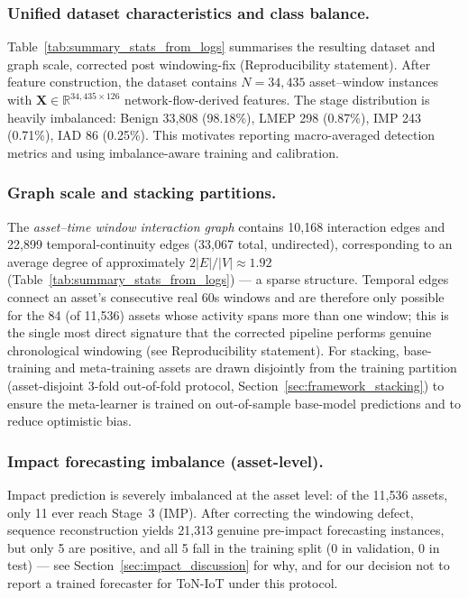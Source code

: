 \documentclass[pdflatex,sn-mathphys-num]{sn-jnl}
\theoremstyle{thmstyleone}%
\theoremstyle{thmstyletwo}%
\theoremstyle{thmstylethree}%
\begin{document}
\color{black}

\subsubsection{Unified dataset characteristics and class balance.}
Table~\ref{tab:summary_stats_from_logs} summarises the resulting dataset and graph scale, corrected post windowing-fix (Reproducibility statement). After feature construction, the dataset contains $N=34{,}435$ asset--window instances with $\mathbf{X}\in\mathbb{R}^{34{,}435\times 126}$ network-flow-derived features. The stage distribution is heavily imbalanced: Benign 33{,}808 (98.18\%), LMEP 298 (0.87\%), IMP 243 (0.71\%), IAD 86 (0.25\%). This motivates reporting macro-averaged detection metrics and using imbalance-aware training and calibration.

\subsubsection{Graph scale and stacking partitions.}
The \emph{asset--time window interaction graph} contains 10{,}168 interaction edges and 22{,}899 temporal-continuity edges (33{,}067 total, undirected), corresponding to an average degree of approximately $2|E|/|V|\approx 1.92$ (Table~\ref{tab:summary_stats_from_logs}) --- a sparse structure. Temporal edges connect an asset's consecutive real 60s windows and are therefore only possible for the 84 (of 11,536) assets whose activity spans more than one window; this is the single most direct signature that the corrected pipeline performs genuine chronological windowing (see Reproducibility statement). For stacking, base-training and meta-training assets are drawn disjointly from the training partition (asset-disjoint 3-fold out-of-fold protocol, Section~\ref{sec:framework_stacking}) to ensure the meta-learner is trained on out-of-sample base-model predictions and to reduce optimistic bias.

\subsubsection{Impact forecasting imbalance (asset-level).}
Impact prediction is severely imbalanced at the asset level: of the 11,536 assets, only 11 ever reach Stage~3 (IMP). After correcting the windowing defect, sequence reconstruction yields 21{,}313 genuine pre-impact forecasting instances, but only 5 are positive, and all 5 fall in the training split (0 in validation, 0 in test) --- see Section~\ref{sec:impact_discussion} for why, and for our decision not to report a trained forecaster for ToN-IoT under this protocol.
\end{document}
